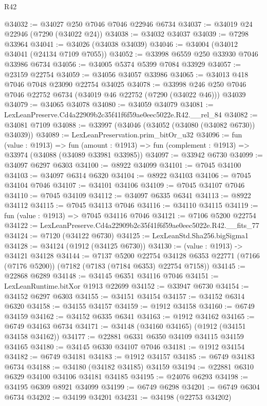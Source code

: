 \begin{lexlean}{R42}
\begin{coremodule}
{@34032 := @34027 @250 @7046 @7046 @22946 @6734
@34037 := @34019 @24 @22946 (@7290 (@34022 @24))
@34038 := @34032 @34037
@34039 := @7298 @33964
@34041 := @34026 (@34038 @34039)
@34046 := @34004 (@34012 @34041 (@24134 @7109 @7055))
@34052 := @33998 @6559 @250 @33930 @7046 @33986 @6734
@34056 := @34005 @5374 @5399 @7084 @33929
@34057 := @23159 @22754
@34059 := @34056 @34057 @33986
@34065 := @34013 @418 @7046 @7048 @23090 @22754 @34025
@34078 := @33998 @246 @250 @7046 @7046 @22752 @6734 (@34019 @46 @22752 (@7290 (@34022 @46))) @34039
@34079 := @34065 @34078
@34080 := @34059 @34079
@34081 := LexLeanPreserve.Cd4a22909b2c35f41f6f59ae0eec5022e.R42.__rel_84
@34082 := @34081 @7109
@34088 := @33997 (@34046 (@34052 (@34080 (@34082 @6730)) @34039))
@34089 := LexLeanPreservation.prim_bitOr_u32
@34096 := fun (value : @1913) =>
  fun (amount : @1913) => fun (complement : @1913) => @33974 (@34088 (@34089 @33981 @33985))
@34097 := @33942 @6730
@34099 := @34097 @6297 @6303
@34100 := @8922 @34099
@34101 := @7045 @34100
@34103 := @34097 @6314 @6320
@34104 := @8922 @34103
@34106 := @7045 @34104 @7046
@34107 := @34101 @34106
@34109 := @7045 @34107 @7046
@34110 := @7045 @34109
@34112 := @34097 @6335 @6341
@34113 := @8922 @34112
@34115 := @7045 @34113 @7046
@34116 := @34110 @34115
@34119 := fun (value : @1913) => @7045 @34116 @7046
@34121 := @7106 @5200 @22754
@34122 := LexLeanPreserve.Cd4a22909b2c35f41f6f59ae0eec5022e.R42.__fits_77
@34124 := @7120 (@34122 @6730)
@34125 := LexLeanStd.Sha256.bigSigma1
@34128 := @34124 (@1912 (@34125 @6730))
@34130 := (value : @1913) -> @34121 @34128
@34144 := @7137
    @5200
    @22754
    @34128
    @6353
    @22771
    (@7166 (@7176 @5200))
    (@7182 (@7183 (@7184 @6353) @22754 @7158))
@34145 := @22868 @6289
@34148 := @34145 @6351 @34116 @7046
@34151 := LexLeanRuntime.bitXor @1913 @22699
@34152 := @33947 @6730
@34154 := @34152 @6297 @6303
@34155 := @34151 @34154
@34157 := @34152 @6314 @6320
@34158 := @34155 @34157
@34159 := @1912 @34158
@34160 := @6749 @34159
@34162 := @34152 @6335 @6341
@34163 := @1912 @34162
@34165 := @6749 @34163 @6734
@34171 := @34148 (@34160 @34165) (@1912 (@34151 @34158 @34162))
@34177 := @22881 @6331 @6350 @34109 @34115 @34159 @34165
@34180 := @34145 @6330 @34107 @7046
@34181 := @1912 @34154
@34182 := @6749 @34181
@34183 := @1912 @34157
@34185 := @6749 @34183 @6734
@34188 := @34180 (@34182 @34185) @34159
@34194 := @22881 @6310 @6329 @34100 @34106 @34181 @34185
@34195 := @24076 @6293
@34198 := @34195 @6309 @8921 @34099
@34199 := @6749 @6298
@34201 := @6749 @6304 @6734
@34202 := @34199 @34201
@34231 := @34198
    (@22753 @34202)
}
\end{coremodule}
\end{lexlean}
